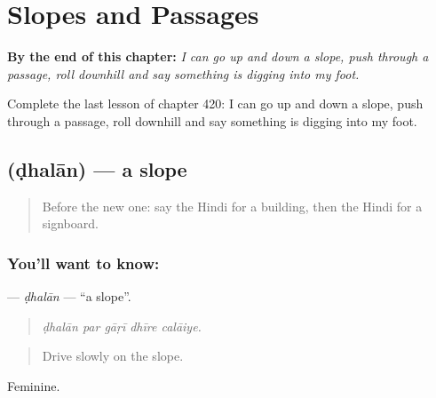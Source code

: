 
\chapter{Slopes and Passages}
\label{ch:hi-slopes-and-passages}

\begin{chapteropening}
\textbf{By the end of this chapter:} \emph{I can go up and down a slope, push through a passage, roll downhill and say something is digging into my foot.}

Complete the last lesson of chapter 420: I can go up and down a slope, push through a passage, roll downhill and say something is digging into my foot.
\end{chapteropening}

\section[\texorpdfstring{\hi{ढलान} (ḍhalān)}{ढलान (ḍhalān)}]{ (ḍhalān) — a slope}

\label{lesson:HI-C420-dhalan}



\begin{quote}
Before the new one: say the Hindi for a building, then the Hindi for a signboard.
\end{quote}

\subsection*{You'll want to know: }
\textbf{} — \emph{ḍhalān} — \textquotedblleft{}a slope\textquotedblright{}.

\begin{quote}
    
\end{quote}

\begin{quote}
\emph{ḍhalān par gāṛī dhīre calāiye.}
\end{quote}

\begin{quote}
Drive slowly on the slope.
\end{quote}

Feminine.


